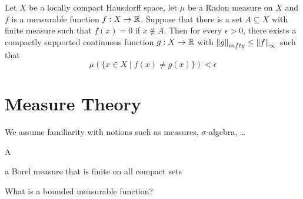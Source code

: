 \begin{theorem}
   \label{thm:lusin}
   Let $X$ be a locally compact Hausdorff space, let $\mu$ be a Radon measure on
   $X$ and $f$ is a measurable function $f: X \to \mathbb{R}$. Suppose that there is a
   set $A \subseteq X$ with finite measure such that $f(x)=0$ if $x\not\in A$.
   Then for every $\epsilon >0$, there exists a compactly supported continuous
   function $g: X \to \mathbb{R}$ with $\left\| g \right\|_{infty} \leq \left\| f \right\|_{\infty}$ such that
   \begin{equation}
      \mu(\{ x\in X \mid f(x) \not= g(x) \}) < \epsilon
   \end{equation}
\end{theorem}

\section{Measure Theory}

We assume familiarity with notions such as measures, $\sigma$-algebra, \dots

\begin{definition}
   A 
\end{definition}

\begin{definition}
   a Borel measure that is finite on all compact sets   
\end{definition}

\begin{definition}
   
\end{definition}

What is a bounded measurable function?

\begin{definition}
   
\end{definition}

